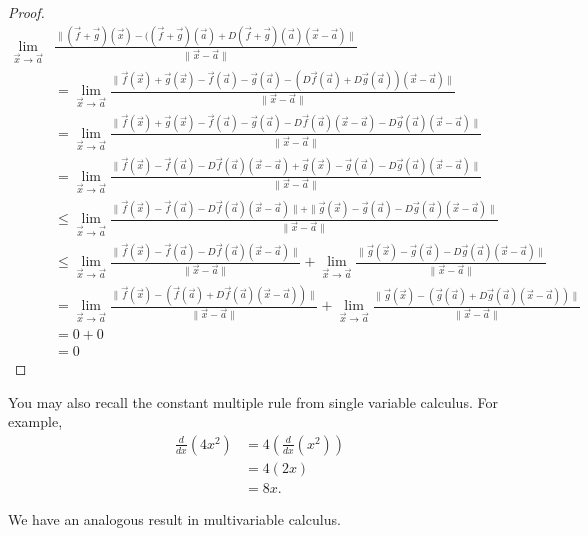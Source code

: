 \documentclass{ximera}
\begin{document}
\begin{proof}
\begin{align*}
\lim_{\vec{x}\rightarrow\vec{a}}&\frac{\|(\vec{f}+\vec{g})(\vec{x}) - ((\vec{f}+\vec{g})(\vec{a})+D(\vec{f}+\vec{g})(\vec{a})(\vec{x}-\vec{a})\|}{\|\vec{x}-\vec{a}\|}\\
&= \lim_{\vec{x}\rightarrow\vec{a}}\frac{\|\vec{f}(\vec{x})+\vec{g}(\vec{x}) - \vec{f}(\vec{a})-\vec{g}(\vec{a})-(D\vec{f}(\vec{a})+D\vec{g}(\vec{a}))(\vec{x}-\vec{a})\|}{\|\vec{x}-\vec{a}\|}\\
&= \lim_{\vec{x}\rightarrow\vec{a}}\frac{\|\vec{f}(\vec{x})+\vec{g}(\vec{x}) - \vec{f}(\vec{a})-\vec{g}(\vec{a})-D\vec{f}(\vec{a})(\vec{x}-\vec{a})-D\vec{g}(\vec{a})(\vec{x}-\vec{a})\|}{\|\vec{x}-\vec{a}\|}\\
&= \lim_{\vec{x}\rightarrow\vec{a}}\frac{\|\vec{f}(\vec{x}) - \vec{f}(\vec{a})-D\vec{f}(\vec{a})(\vec{x}-\vec{a})+\vec{g}(\vec{x}) - \vec{g}(\vec{a})-D\vec{g}(\vec{a})(\vec{x}-\vec{a})\|}{\|\vec{x}-\vec{a}\|}\\
&\leq \lim_{\vec{x}\rightarrow\vec{a}}\frac{\|\vec{f}(\vec{x}) - \vec{f}(\vec{a})-D\vec{f}(\vec{a})(\vec{x}-\vec{a})\|+\|\vec{g}(\vec{x}) - \vec{g}(\vec{a})-D\vec{g}(\vec{a})(\vec{x}-\vec{a})\|}{\|\vec{x}-\vec{a}\|}\\
&\leq \lim_{\vec{x}\rightarrow\vec{a}}\frac{\|\vec{f}(\vec{x}) - \vec{f}(\vec{a})-D\vec{f}(\vec{a})(\vec{x}-\vec{a})\|}{\|\vec{x}-\vec{a}\|}+\lim_{\vec{x}\rightarrow\vec{a}}\frac{\|\vec{g}(\vec{x}) - \vec{g}(\vec{a})-D\vec{g}(\vec{a})(\vec{x}-\vec{a})\|}{\|\vec{x}-\vec{a}\|}\\
&= \lim_{\vec{x}\rightarrow\vec{a}}\frac{\|\vec{f}(\vec{x}) - (\vec{f}(\vec{a})+D\vec{f}(\vec{a})(\vec{x}-\vec{a}))\|}{\|\vec{x}-\vec{a}\|}+\lim_{\vec{x}\rightarrow\vec{a}}\frac{\|\vec{g}(\vec{x}) - (\vec{g}(\vec{a})+D\vec{g}(\vec{a})(\vec{x}-\vec{a}))\|}{\|\vec{x}-\vec{a}\|}\\
&= 0 + 0\\
&= 0
\end{align*}

\end{proof}

You may also recall the constant multiple rule from single variable calculus. For example,
\begin{align*}
\frac{d}{dx}(4x^2) &= 4\left(\frac{d}{dx}(x^2)\right)\\
&= 4(2x)\\
&=8x.
\end{align*}

We have an analogous result in multivariable calculus.
\end{document}
